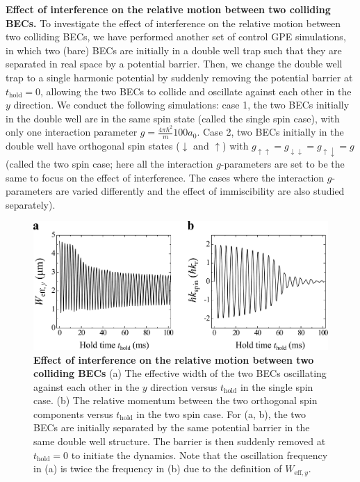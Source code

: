 \documentclass[showpacs,preprintnumbers,amsmath,amssymb, superscriptaddress, aps, reprint]{revtex4-1}
\def\thold{t_{\text{hold}}}
\begin{document}
{{\clearpage
\vspace{5mm}
\noindent
\textbf{Effect of interference on the relative motion between two colliding BECs.} To investigate the effect of interference on the relative motion between two colliding BECs, we have performed another set of control GPE simulations, in which two (bare) BECs are initially in a double well trap such that they are separated in real space by a potential barrier. Then, we change the double well trap to a single harmonic potential by suddenly removing the potential barrier at $\thold=0$, allowing the two BECs to collide and oscillate against each other in the $y$ direction. We conduct the following simulations: case 1, the two BECs initially in the double well are in the same spin state (called the single spin case), with only one interaction parameter $g=\frac{{4\pi {\hbar ^2}}}{m}100a_0$. Case 2, two BECs initially in the double well have orthogonal spin states ($\downarrow$ and $\uparrow$) with ${g_{ \uparrow  \uparrow }}={g_{ \downarrow  \downarrow }}={g_{ \uparrow  \downarrow }}=g$ (called the two spin case; here all the interaction $g$-parameters are set to be the same to focus on the effect of interference. The cases where the interaction $g$-parameters are varied differently and the effect of immiscibility are also studied separately). 

\vspace{5mm}
\begin{figure}[H]
\centering
\includegraphics[width=5.1in]{SI_Fig5_binary_singleCom_on_long_Vfinal.pdf}
\caption{\textbf{Effect of interference on the relative motion between two colliding BECs} (a) The effective width of the two BECs oscillating against each other in the $y$ direction versus $\thold$ in the single spin case. (b) The relative momentum between the two orthogonal spin components versus $\thold$ in the two spin case. For (a, b), the two BECs are initially separated by the same potential barrier in the same double well structure. The barrier is then suddenly removed at $\thold=0$ to initiate the dynamics. Note that the oscillation frequency in (a) is twice the frequency in (b) due to the definition of $W_{\text{eff},y}$.}

\end{figure}}}
\end{document}
